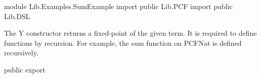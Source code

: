 \begin{hidden}
module Lib.Examples.SumExample
import public Lib.PCF
import public Lib.DSL
\end{hidden}

The Y constructor returns a fixed-point of the given term. It is required to
define functions by recursion. For example, the sum function on PCFNat is
defined recursively.

\begin{hidden}
public export   
\end{hidden}
